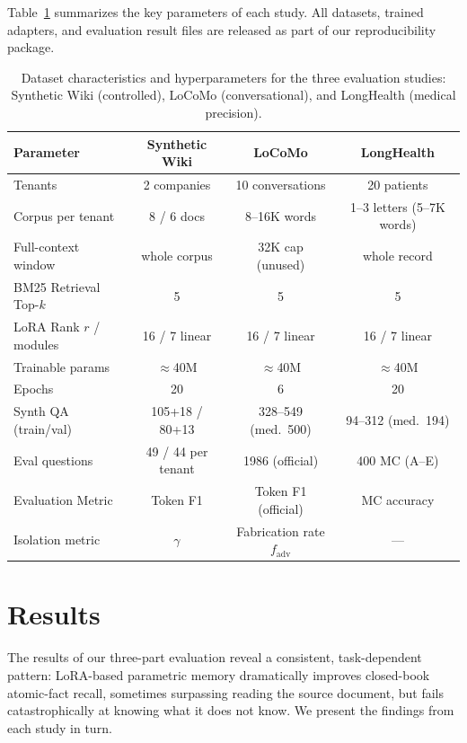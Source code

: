 \documentclass[conference]{IEEEtran}
\begin{document}
Table~\ref{tab:setup_summary} summarizes the key parameters of each study. All datasets, trained adapters, and evaluation result files are released as part of our reproducibility package.
\begin{table}[!t]
\centering
\caption{Dataset characteristics and hyperparameters for the three evaluation studies: Synthetic Wiki (controlled), LoCoMo (conversational), and LongHealth (medical precision).}
\label{tab:setup_summary}
\begin{tabular}{lccc}
\toprule
\textbf{Parameter} & \textbf{Synthetic Wiki} & \textbf{LoCoMo} & \textbf{LongHealth} \\
\midrule
Tenants & 2 companies & 10 conversations & 20 patients \\
Corpus per tenant & 8 / 6 docs & 8--16K words & 1--3 letters (5--7K words) \\
Full-context window & whole corpus & 32K cap (unused) & whole record \\
BM25 Retrieval Top-$k$ & 5 & 5 & 5 \\
LoRA Rank $r$ / modules & 16 / 7 linear & 16 / 7 linear & 16 / 7 linear \\
Trainable params & $\approx$40M & $\approx$40M & $\approx$40M \\
Epochs & 20 & 6 & 20 \\
Synth QA (train/val) & 105+18 / 80+13 & 328--549 (med.\ 500) & 94--312 (med.\ 194) \\
Eval questions & 49 / 44 per tenant & 1986 (official) & 400 MC (A--E) \\
Evaluation Metric & Token F1 & Token F1 (official) & MC accuracy \\
Isolation metric & $\gamma$ & Fabrication rate $f_{\text{adv}}$ & — \\
\bottomrule
\end{tabular}
\end{table}

\section{Results}
The results of our three-part evaluation reveal a consistent, task-dependent pattern: LoRA-based parametric memory dramatically improves closed-book atomic-fact recall, sometimes surpassing reading the source document, but fails catastrophically at knowing what it does not know. We present the findings from each study in turn.
\end{document}
